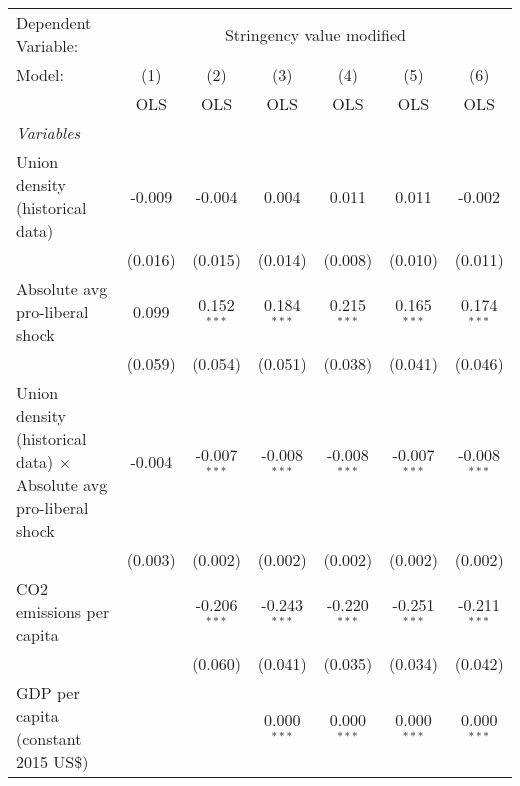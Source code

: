 
\begingroup
\centering
\begin{tabular}{lcccccc}
   \toprule
   Dependent Variable: & \multicolumn{6}{c}{Stringency value modified}\\
   Model:                                                                   & (1)     & (2)            & (3)            & (4)            & (5)            & (6)\\  
                                                                            &  OLS    & OLS            & OLS            & OLS            & OLS            & OLS\\  
   \midrule
   \emph{Variables}\\
   Union density (historical data)                                          & -0.009  & -0.004         & 0.004          & 0.011          & 0.011          & -0.002\\   
                                                                            & (0.016) & (0.015)        & (0.014)        & (0.008)        & (0.010)        & (0.011)\\   
   Absolute avg pro-liberal shock                                           & 0.099   & 0.152$^{***}$  & 0.184$^{***}$  & 0.215$^{***}$  & 0.165$^{***}$  & 0.174$^{***}$\\   
                                                                            & (0.059) & (0.054)        & (0.051)        & (0.038)        & (0.041)        & (0.046)\\   
   Union density (historical data) $\times$ Absolute avg pro-liberal shock  & -0.004  & -0.007$^{***}$ & -0.008$^{***}$ & -0.008$^{***}$ & -0.007$^{***}$ & -0.008$^{***}$\\   
                                                                            & (0.003) & (0.002)        & (0.002)        & (0.002)        & (0.002)        & (0.002)\\   
   CO2 emissions per capita                                                 &         & -0.206$^{***}$ & -0.243$^{***}$ & -0.220$^{***}$ & -0.251$^{***}$ & -0.211$^{***}$\\   
                                                                            &         & (0.060)        & (0.041)        & (0.035)        & (0.034)        & (0.042)\\   
   GDP per capita (constant 2015 US\$)                                      &         &                & 0.000$^{***}$  & 0.000$^{***}$  & 0.000$^{***}$  & 0.000$^{***}$\\   

\end{tabular}
